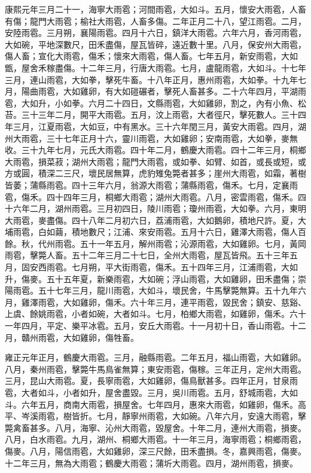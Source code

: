 \begin{pinyinscope}
康熙元年三月二十一，海寧大雨雹；河間雨雹，大如斗。五月，懷安大雨雹，人畜有傷；龍門大雨雹；榆社大雨雹，人畜多傷。二年正月二十八，望江雨雹。二月，安陸雨雹。三月朔，襄陽雨雹。四月十六日，鎮洋大雨雹。六年六月，香河雨雹，大如碗，平地深數尺，田禾盡傷，屋瓦皆碎，遠近數十里。八月，保安州大雨雹，傷人畜；宣化大雨雹，傷禾；懷來大雨雹，傷人畜。七年五月，新安雨雹，大如甑，屋舍禾稼盡傷。十二年三月，行唐大雨雹。七月，盧龍雨雹，大如斗。十七年三月，連山雨雹，大如拳，擊死牛畜。十八年正月，惠州雨雹，大如拳。十九年七月，陽曲雨雹，大如雞卵，有大如磑碾者，擊死人畜甚多。二十六年四月，平湖雨雹，大如升，小如拳。六月二十四日，文縣雨雹，大如雞卵，割之，內有小魚、松苔。三十三年二月，開平大雨雹。五月，汶上雨雹，大者徑尺，擊死數人。三十四年三月，江夏雨雹，大如豆，中有黑水。三十六年閏三月，黃安大雨雹。四月，湖州大雨雹，三十七年正月十六，靈川雨雹，大如雞卵；安南雨雹，大如拳，麥無收。三十九年七月，元氏大雨雹。四十年二月，鶴慶大雨雹。四十二年三月，桐鄉大雨雹，損菜菽；湖州大雨雹；龍門大雨雹，或如拳、如臂、如首，或長或短，或方或圓，積深二三尺，壞民居無算，虎豹雉兔斃者甚多；崖州大雨雹，如霜，著樹皆萎；蒲縣雨雹。四十三年六月，翁源大雨雹；蒲縣雨雹，傷禾。七月，定襄雨雹，傷禾。四十四年三月，桐鄉大雨雹；湖州大雨雹。八月，密雲雨雹，傷禾。四十六年二月，湖州雨雹。三月初四日，陵川雨雹；瓊州雨雹，大如拳。六月，東明大雨雹，麥盡傷。四十八年二月初六日，荔浦雨雹，大如鵝卵，積地尺許。夏，大埔雨雹，白如繭，積地數尺；江浦、來安雨雹。五月十六日，雞澤大雨雹，傷人百餘。秋，代州雨雹。五十一年五月，解州雨雹；沁源雨雹，大如雞卵。七月，黃岡雨雹，擊斃人畜。五十二年三月二十七日，全州大雨雹，屋瓦皆飛。五十三年五月，固安西雨雹。七月朔，平大街雨雹，傷禾。五十四年三月，江浦雨雹，大如升，傷麥。五十五年夏，新樂雨雹，大如碗；浮山雨雹，大如雞卵，田禾盡傷；崇陽雨雹。五十七年三月，龍川雨雹，大如斗，壞民舍，牛馬擊斃無算。五十九年六月，雞澤雨雹，大如雞卵，傷禾。六十年三月，連平雨雹，毀民舍；鎮安、慈谿、上虞、餘姚雨雹，小者如碗，大者如斗。七月，柏鄉大雨雹，如雞卵，傷禾。六十一年四月，平定、樂平冰雹。五月，安丘大雨雹。十一月初十日，香山雨雹。十二月，贛州雨雹，大如雞卵，傷牲畜。

雍正元年正月，鶴慶大雨雹。三月，融縣雨雹。二年五月，福山雨雹，大如雞卵。八月，秦州雨雹，擊斃牛馬鳥雀無算；東安雨雹，傷稼。三年正月，定州大雨雹。三月，昆山大雨雹。夏，長寧雨雹，大如雞卵，傷鳥獸甚多。四年正月，甘泉雨雹，大者如斗，小者如升，屋舍盡毀。三月，吳川雨雹。五月，舒城雨雹，大如斗。六年五月，商南大雨雹，損屋舍。七年四月，惠來大雨雹，如雞卵，傷禾。高平、岑溪雨雹，樹皆折。七月，靜寧州雨雹，大如碗。八年六月，安遠大雨雹，擊斃禽畜甚多。八月，海寧、沁州大雨雹，毀屋舍。十年二月，連州大雨雹，損麥。八月，白水雨雹。九月，湖州、桐鄉大雨雹。十一年三月，海寧雨雹；桐鄉雨雹，傷麥。八月，陽信雨雹，大如雞卵，深三尺餘，田禾盡損。冬，嘉興雨雹，傷麥。十二年三月，無為大雨雹；鶴慶大雨雹；蒲圻大雨雹。四月，湖州雨雹，損麥。


\end{pinyinscope}
